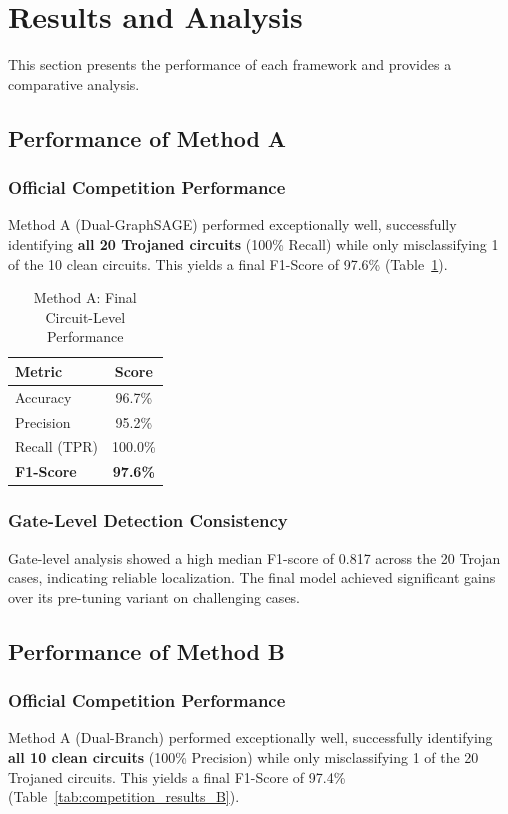 \documentclass[conference]{IEEEtran}
\begin{document}
\section{Results and Analysis}
\label{sec:results}
This section presents the performance of each framework and provides a comparative analysis.

\subsection{Performance of Method A}
\subsubsection{Official Competition Performance}
Method A (Dual-GraphSAGE) performed exceptionally well, successfully identifying \textbf{all 20 Trojaned circuits} (100\% Recall) while only misclassifying 1 of the 10 clean circuits. This yields a final F1-Score of 97.6\% (Table~\ref{tab:competition_results_A}).

\begin{table}[h!]
    \centering
    \caption{Method A: Final Circuit-Level Performance}
    \label{tab:competition_results_A}
    \begin{tabular}{lc}
        \toprule
        \textbf{Metric} & \textbf{Score} \\ \midrule
        Accuracy      & 96.7\% \\
        Precision     & 95.2\% \\
        Recall (TPR)  & 100.0\% \\
        \textbf{F1-Score}      & \textbf{97.6\%} \\ \bottomrule
    \end{tabular}
\end{table}
\subsubsection{Gate-Level Detection Consistency}
Gate-level analysis showed a high median F1-score of 0.817 across the 20 Trojan cases, indicating reliable localization. The final model achieved significant gains over its pre-tuning variant on challenging cases.

\subsection{Performance of Method B}
\subsubsection{Official Competition Performance}
Method A (Dual-Branch) performed exceptionally well, successfully identifying \textbf{all 10 clean circuits} (100\% Precision) while only misclassifying 1 of the 20 Trojaned circuits. This yields a final F1-Score of 97.4\% (Table~\ref{tab:competition_results_B}).
\end{document}
